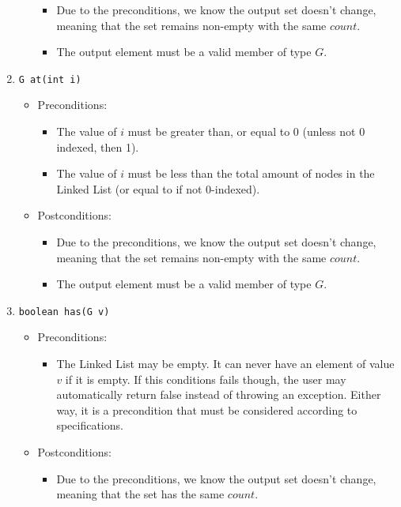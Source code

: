 \documentclass{article}
\begin{document}
\begin{enumerate}
\begin{itemize}
        \begin{itemize}
            \item Due to the preconditions, we know the output set doesn't change, meaning that the set remains non-empty with the same $count$.
            \item The output element must be a valid member of type $G$.
        \end{itemize}
    \end{itemize}
    \item \texttt{G at(int i)}
    \begin{itemize}
        \item Preconditions:
        \begin{itemize}
            \item The value of $i$ must be greater than, or equal to 0 (unless not 0 indexed, then 1).
            \item The value of $i$ must be less than the total amount of nodes in the Linked List (or equal to if not 0-indexed).
        \end{itemize}
        \item Postconditions:
        \begin{itemize}
            \item Due to the preconditions, we know the output set doesn't change, meaning that the set remains non-empty with the same $count$.
            \item The output element must be a valid member of type $G$.
        \end{itemize}
    \end{itemize}
    \item \texttt{boolean has(G v)}
    \begin{itemize}
        \item Preconditions:
        \begin{itemize}
            \item The Linked List may be empty. It can never have an element of value $v$ if it is empty. If this conditions fails though, the user may automatically return false instead of throwing an exception. Either way, it is a precondition that must be considered according to specifications.
        \end{itemize}
        \item Postconditions:
        \begin{itemize}
            \item Due to the preconditions, we know the output set doesn't change, meaning that the set has the same $count$.

\end{itemize}
\end{itemize}
\end{enumerate}
\end{document}
